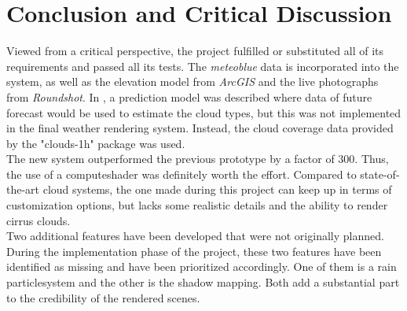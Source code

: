 \section{Conclusion and Critical Discussion}
\label{section:conclusion}
Viewed from a critical perspective, the project fulfilled or substituted all of its requirements and passed all its tests.
The \emph{meteoblue} data is incorporated into the system, as well as the elevation model from \emph{ArcGIS} and the live photographs from \emph{Roundshot}.
In , a prediction model was described where data of future forecast would be used to estimate the cloud types, but this was not implemented in the final weather rendering system. Instead, the cloud coverage data provided by the "clouds-1h" package was used.
\\
The new system outperformed the previous prototype by a factor of 300. Thus, the use of a \gls{computeshader} was definitely worth the effort.
Compared to state-of-the-art cloud systems, the one made during this project can keep up in terms of customization options, but lacks some realistic details and the ability to render cirrus clouds.
\\
Two additional features have been developed that were not originally planned. 
During the implementation phase of the project, these two features have been identified as missing and have been prioritized accordingly.
One of them is a rain \gls{particlesystem} and the other is the shadow mapping.
Both add a substantial part to the credibility of the rendered scenes.